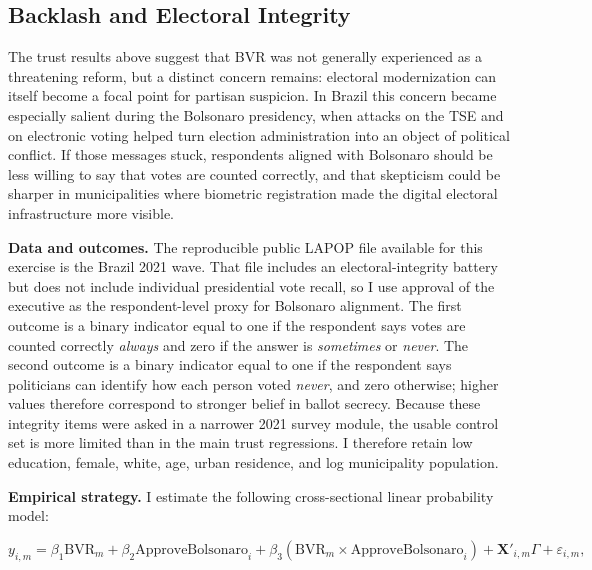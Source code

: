 \subsection{Backlash and Electoral Integrity}
\label{sec:backlash-integrity}

The trust results above suggest that BVR was not generally experienced as a threatening reform, but a distinct concern remains: electoral modernization can itself become a focal point for partisan suspicion. In Brazil this concern became especially salient during the Bolsonaro presidency, when attacks on the TSE and on electronic voting helped turn election administration into an object of political conflict. If those messages stuck, respondents aligned with Bolsonaro should be less willing to say that votes are counted correctly, and that skepticism could be sharper in municipalities where biometric registration made the digital electoral infrastructure more visible.

\textbf{Data and outcomes.} The reproducible public LAPOP file available for this exercise is the Brazil 2021 wave. That file includes an electoral-integrity battery but does not include individual presidential vote recall, so I use approval of the executive as the respondent-level proxy for Bolsonaro alignment. The first outcome is a binary indicator equal to one if the respondent says votes are counted correctly \emph{always} and zero if the answer is \emph{sometimes} or \emph{never}. The second outcome is a binary indicator equal to one if the respondent says politicians can identify how each person voted \emph{never}, and zero otherwise; higher values therefore correspond to stronger belief in ballot secrecy. Because these integrity items were asked in a narrower 2021 survey module, the usable control set is more limited than in the main trust regressions. I therefore retain low education, female, white, age, urban residence, and log municipality population.

\textbf{Empirical strategy.} I estimate the following cross-sectional linear probability model:

\begin{equation}
\label{eq:lapop-bvr-backlash}
y_{i,m} = \beta_1 \text{BVR}_m + \beta_2 \text{ApproveBolsonaro}_i + \beta_3 \left(\text{BVR}_m \times \text{ApproveBolsonaro}_i\right) + \mathbf{X}'_{i,m}\Gamma + \varepsilon_{i,m},
\end{equation}

